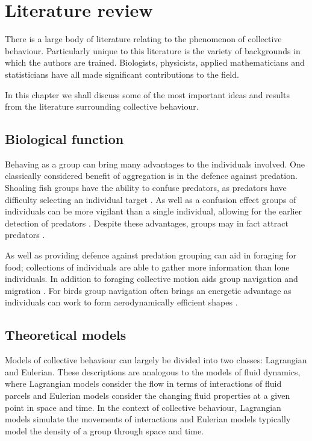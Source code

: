\chapter{Literature review}
\label{cha:lit_review}

There is a large body of literature relating to the phenomenon of collective behaviour. Particularly unique to this literature is the variety of backgrounds in which the authors are trained. Biologists, physicists, applied mathematicians and statisticians have all made significant contributions to the field.

In this chapter we shall discuss some of the most important ideas and results from the literature surrounding collective behaviour.

\section{Biological function}
\label{sec:biological_function}

Behaving as a group can bring many advantages to the individuals involved. One classically considered  benefit of aggregation is in the defence against predation. Shoaling fish groups have the ability to confuse predators, as predators have difficulty selecting an individual target \citep{landeau86}. As well as a confusion effect groups of individuals can be more vigilant than a single individual, allowing for the earlier detection of predators \citep{pitcher93}. Despite these advantages, groups may in fact attract predators \citep{wittenberger85}.

As well as providing defence against predation grouping can aid in foraging for food; collections of individuals are able to gather more information than lone individuals. In addition to foraging collective motion aids group navigation and migration \citep{simmons04}. For birds group navigation often brings an energetic advantage as individuals can work to form aerodynamically efficient shapes \citep{weimerskirch01}.

\section{Theoretical models}
\label{sec:models}

Models of collective behaviour can largely be divided into two classes: Lagrangian and Eulerian. These descriptions are analogous to the models of fluid dynamics, where Lagrangian models consider the flow in terms of interactions of fluid parcels and Eulerian models consider the changing fluid properties at a given point in space and time. In the context of collective behaviour, Lagrangian models simulate the movements of interactions and Eulerian models typically model the density of a group through space and time.

